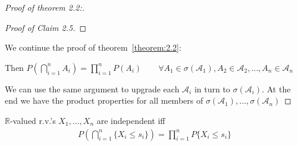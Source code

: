 \documentclass[11pt]{article}
\begin{document}
\begin{proof}[Proof of theorem 2.2:]
\begin{claim}
\begin{proof}[Proof of Claim 2.5]
        \end{proof}
    \end{claim}
    We continue the proof of theorem~\ref{theorem:2.2}:

    Then $P(\bigcap _{i=1}^{n} A_i) = \prod_{i=1}^{n} P(A_{i}) \qquad \forall 
     A_1 \in \sigma(\mathcal{A}_1), A_2 \in \mathcal{A}_{2}, \ldots ,A_n \in \mathcal{A}_{n}$

     We can use the same argument to upgrade each $\mathcal{A}_i$ in turn to $\sigma(\mathcal{A}_{i})$.
     At the end we have the product properties for all members of $\sigma(\mathcal{A}_{1}), \ldots ,
     \sigma(\mathcal{A}_{n})$
\end{proof}

\begin{corollary}
    $\mathbb{R}$-valued r.v.'s $X_1, \ldots ,X_n$ are independent iff 
    \begin{align*}
        P(\bigcap _{i=1}^{n}\{ X_{i} \le s_i \}) = \prod_{i=1}^{n}P\{ X_{i} \le s_i \} 
    \end{align*}
\end{corollary}
\end{document}
